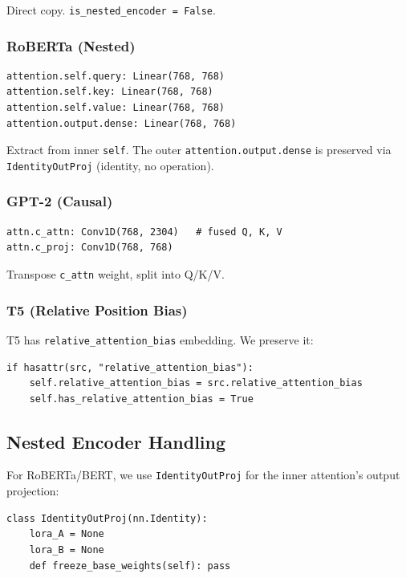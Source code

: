 Direct copy. \texttt{is\_nested\_encoder = False}.

\subsubsection{RoBERTa (Nested)}

\begin{lstlisting}
attention.self.query: Linear(768, 768)
attention.self.key: Linear(768, 768)
attention.self.value: Linear(768, 768)
attention.output.dense: Linear(768, 768)
\end{lstlisting}

Extract from inner \texttt{self}. The outer \texttt{attention.output.dense} is preserved 
via \texttt{IdentityOutProj} (identity, no operation).

\subsubsection{GPT-2 (Causal)}

\begin{lstlisting}
attn.c_attn: Conv1D(768, 2304)   # fused Q, K, V
attn.c_proj: Conv1D(768, 768)
\end{lstlisting}

Transpose \texttt{c\_attn} weight, split into Q/K/V.

\subsubsection{T5 (Relative Position Bias)}

T5 has \texttt{relative\_attention\_bias} embedding. We preserve it:

\begin{lstlisting}
if hasattr(src, "relative_attention_bias"):
    self.relative_attention_bias = src.relative_attention_bias
    self.has_relative_attention_bias = True
\end{lstlisting}

\subsection{Nested Encoder Handling}

For RoBERTa/BERT, we use \texttt{IdentityOutProj} for the inner attention's output 
projection:

\begin{lstlisting}
class IdentityOutProj(nn.Identity):
    lora_A = None
    lora_B = None
    def freeze_base_weights(self): pass
\end{lstlisting}

